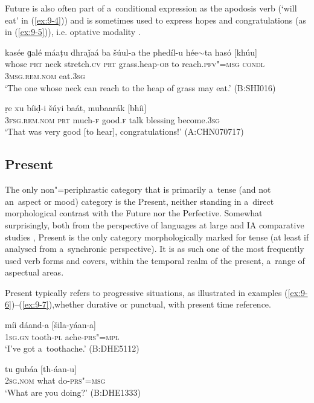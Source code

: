 Future is also often part of a~conditional expression as the apodosis verb (`will eat' in (\ref{ex:9-4})) and is sometimes used to express hopes and congratulations (as in (\ref{ex:9-5})), i.e. optative modality \citep[179]{bybeeetal1994}.

\begin{exe}
\ex
\label{ex:9-4}
\gll kasée ɡalé máaṭu dhraǰaá ba šúul-a the phedíl-u hée$\sim$ta hasó [khúu] \\
whose \textsc{prt} neck stretch.\textsc{cv} \textsc{prt} grass.heap-\textsc{ob}  to reach.\textsc{pfv"=msg } \textsc{condl} \textsc{3msg.rem.nom} eat.\textsc{3}\textsc{sg} \\
\glt `The one whose neck can reach to the heap of grass may eat.' (B:SHI016)

\ex
\label{ex:9-5}
\gll ṛe xu bíiḍ-i šúyi baát, mubaarák [bhíi] \\
\textsc{3fsg.rem.nom} \textsc{prt } much-\textsc{f} good.\textsc{f} talk blessing  become.\textsc{3}\textsc{sg} \\
\glt `That was very good [to hear], congratulations!' (A:CHN070717)
\end{exe}

\subsection{Present}
\label{subsec:9-1-3}

The only non"=periphrastic category that is primarily a~tense (and not an~aspect or mood) category is the Present, neither standing in a~direct morphological contrast with the Future nor the Perfective. Somewhat surprisingly, both from the perspective of languages at large \citep[103--128]{dahl1985} and IA comparative studies \citep[282, 288--289]{masica1991}, Present is the only category morphologically marked for tense (at least if analysed from a~synchronic perspective). It is as such one of the most frequently used verb forms and covers, within the temporal realm of the present, a~range of aspectual areas. 



Present typically refers to progressive situations, as illustrated in examples (\ref{ex:9-6})--(\ref{ex:9-7}),whether durative or punctual, with present time reference.

\begin{exe}
\ex
\label{ex:9-6}
\gll míi dáand-a [šila-yáan-a] \\
\textsc{1sg.gn} tooth-\textsc{pl} ache-\textsc{prs"=mpl} \\
\glt `I've got a~toothache.' (B:DHE5112)

\ex
\label{ex:9-7}
\gll tu ɡubáa [th-áan-u] \\
\textsc{2sg.nom} what do-\textsc{prs"=msg} \\
\glt `What are you doing?' (B:DHE1333)
\end{exe}


